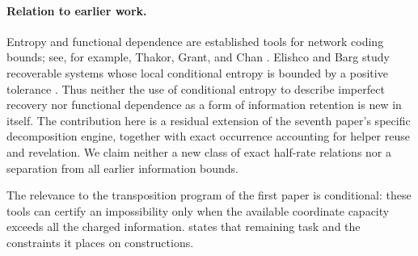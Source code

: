 \paragraph{Relation to earlier work.}
Entropy and functional dependence are established tools for network
coding bounds; see, for example, Thakor, Grant, and Chan
\cite{ThakorGrantChan2009}. Elishco and Barg study recoverable systems
whose local conditional entropy is bounded by a positive tolerance
\cite[Section IV]{ElishcoBarg2022}. Thus neither the use of conditional
entropy to describe imperfect recovery nor functional dependence as a
form of information retention is new in itself. The contribution here
is a residual extension of the seventh paper's specific decomposition
engine, together with exact occurrence accounting for helper reuse and
revelation. We claim neither a new class of exact half-rate relations nor
a separation from all earlier information bounds.

The relevance to the transposition program of the first paper
\cite{FirstPaper2026} is conditional: these tools can certify an
impossibility only when the available coordinate capacity exceeds all
the charged information.  states that remaining
task and the constraints it places on constructions.
